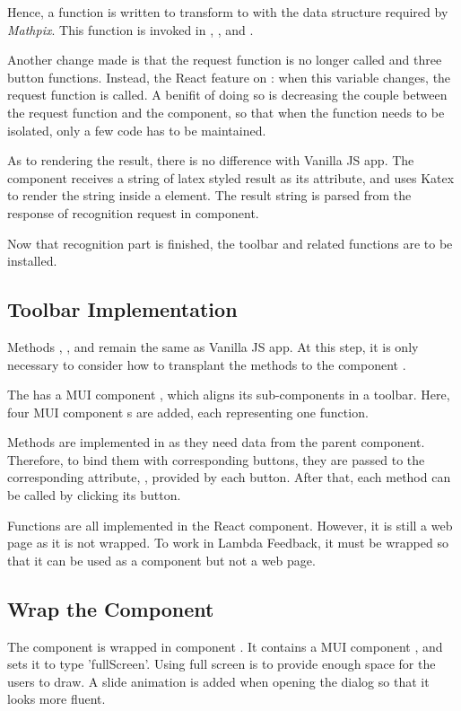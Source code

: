 \documentclass[12pt,twoside]{report}
\begin{document}
Hence, a function  is written to transform 
to  with the data structure required by \textit{Mathpix}. This function is invoked in , ,  and .

Another change made is that the request function is no longer called
 and three button functions. Instead, the React feature
 on : when this variable changes, the request
function is called. A benifit of doing so is decreasing the couple between the
request function and the component, so that when the function needs to be
isolated, only a few code has to be maintained.

As to rendering the result, there is no difference with Vanilla JS app. The
component  receives a string of latex styled result as its
attribute, and uses Katex to render the string inside a  element. The
result string  is parsed from the response of recognition
request in  component.

Now that recognition part is finished, the toolbar and related functions are to be installed. 

\subsection*{Toolbar Implementation}
Methods , ,  and  remain the same as Vanilla JS app. At this step, it is only necessary to consider how to transplant the methods to the component .

The  has a MUI component , which aligns its sub-components in a toolbar. Here, four MUI component s are added, each representing one function.

Methods are implemented in  as they need data from the parent component. Therefore, to bind them with corresponding buttons, they are passed to the corresponding attribute, , provided by each button. After that, each method can be called by clicking its button.

Functions are all implemented in the React component. However, it is still a web page as it is not wrapped. To work in Lambda Feedback, it must be wrapped so that it can be used as a component but not a web page.

\subsection*{Wrap the Component}
The component is wrapped in component . It contains a MUI component , and sets it to type 'fullScreen'. Using full screen is to provide enough space for the users to draw. A slide animation is added when opening the dialog so that it looks more fluent. 
\end{document}
